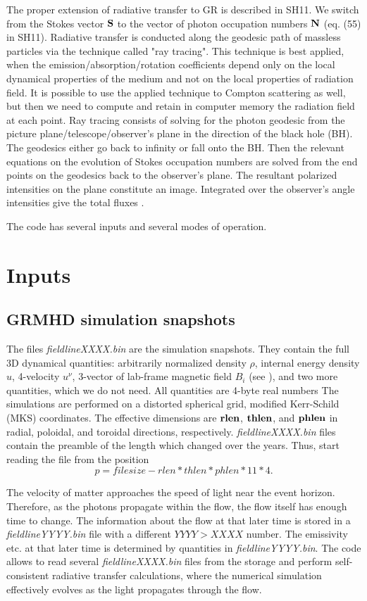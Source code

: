 \documentclass{emulateapjx}
\begin{document}
The proper extension of radiative transfer to GR is described in SH11. We switch from the Stokes vector ${\bf S}$ to the vector of photon occupation numbers ${\bf N}$ (eq. (55) in SH11).
Radiative transfer is conducted along the geodesic path of massless particles via the technique called "ray tracing". This technique is best applied, when the emission/absorption/rotation coefficients depend only on the local dynamical properties of the medium and not on the local properties of radiation field. It is possible to use the applied technique to Compton scattering as well, but then we need to compute and retain in computer memory the radiation field at each point. Ray tracing consists of solving for the photon geodesic from the picture plane/telescope/observer's plane in the direction of the black hole (BH). The geodesics either go back to infinity or fall onto the BH. Then the relevant equations on the evolution of Stokes occupation numbers are solved from the end points on the geodesics back to the observer's plane. The resultant polarized intensities on the plane constitute an image. Integrated over the observer's angle intensities give the total fluxes \citep{Rybicki1979}.

The code has several inputs and several modes of operation.
\section{Inputs}
\subsection{GRMHD simulation snapshots}
The files \textit{fieldlineXXXX.bin} are the simulation snapshots. They contain the full 3D dynamical quantities: arbitrarily normalized density $\rho$, internal energy density $u$,
4-velocity $u^\nu$, 3-vector of lab-frame magnetic field $B_i$ (see \citealt{Penna:2010dj}), and two more quantities, which we do not need. All quantities are 4-byte real numbers
The simulations are performed on a distorted spherical grid, modified Kerr-Schild (MKS) coordinates. The effective dimensions are ${\bf rlen}$, ${\bf thlen}$, and ${\bf phlen}$ in radial, poloidal, and toroidal directions, respectively. \textit{fieldlineXXXX.bin} files contain the preamble of the length which changed over the years. Thus, start reading the file from the position
\begin{equation}
p=filesize-rlen*thlen*phlen*11*4.
\end{equation}

The velocity of matter approaches the speed of light near the event horizon. Therefore, as the photons propagate within the flow, the flow itself has enough time to change.
The information about the flow at that later time is stored in a \textit{fieldlineYYYY.bin} file with a different $YYYY>XXXX$ number. The emissivity etc. at that later time is determined by quantities in \textit{fieldlineYYYY.bin}. The code allows to read several \textit{fieldlineXXXX.bin} files from the storage and perform self-consistent radiative transfer calculations, where the numerical simulation effectively evolves as the light propagates through the flow.
\end{document}
